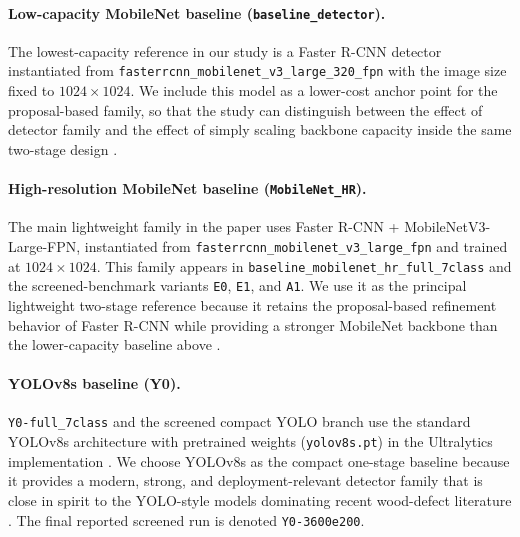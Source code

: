 \paragraph{Low-capacity MobileNet baseline (\texttt{baseline\_detector}).}
The lowest-capacity reference in our study is a Faster R-CNN detector instantiated from \texttt{fasterrcnn\_mobilenet\_v3\_large\_320\_fpn} with the image size fixed to $1024 \times 1024$. We include this model as a lower-cost anchor point for the proposal-based family, so that the study can distinguish between the effect of detector family and the effect of simply scaling backbone capacity inside the same two-stage design \citep{faster_rcnn,mobilenetv3}.

\paragraph{High-resolution MobileNet baseline (\texttt{MobileNet\_HR}).}
The main lightweight family in the paper uses Faster R-CNN + MobileNetV3-Large-FPN, instantiated from \texttt{fasterrcnn\_mobilenet\_v3\_large\_fpn} and trained at $1024 \times 1024$. This family appears in \texttt{baseline\_mobilenet\_hr\_full\_7class} and the screened-benchmark variants \texttt{E0}, \texttt{E1}, and \texttt{A1}. We use it as the principal lightweight two-stage reference because it retains the proposal-based refinement behavior of Faster R-CNN while providing a stronger MobileNet backbone than the lower-capacity baseline above \citep{faster_rcnn,mobilenetv3}.

\paragraph{YOLOv8s baseline (Y0).}
\texttt{Y0-full\_7class} and the screened compact YOLO branch use the standard YOLOv8s architecture with pretrained weights (\texttt{yolov8s.pt}) in the Ultralytics implementation \citep{ultralytics_yolo}. We choose YOLOv8s as the compact one-stage baseline because it provides a modern, strong, and deployment-relevant detector family that is close in spirit to the YOLO-style models dominating recent wood-defect literature \citep{odca_yolo,bpn_yolo,sim_yolo,fdd_yolo}. The final reported screened run is denoted \texttt{Y0-3600e200}.

